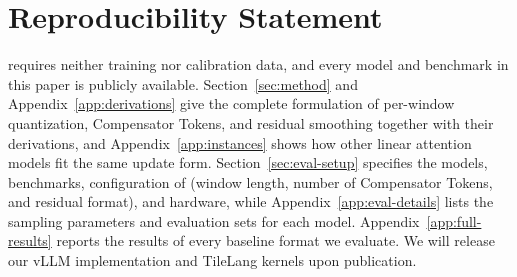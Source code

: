 \section*{Reproducibility Statement}

\method{} requires neither training nor calibration data, and every model and benchmark in this paper is publicly available.
Section~\ref{sec:method} and Appendix~\ref{app:derivations} give the complete formulation of per-window quantization, Compensator Tokens, and residual smoothing together with their derivations, and Appendix~\ref{app:instances} shows how other linear attention models fit the same update form.
Section~\ref{sec:eval-setup} specifies the models, benchmarks, configuration of \method{} (window length, number of Compensator Tokens, and residual format), and hardware, while Appendix~\ref{app:eval-details} lists the sampling parameters and evaluation sets for each model.
Appendix~\ref{app:full-results} reports the results of every baseline format we evaluate.
We will release our vLLM implementation and TileLang kernels upon publication.
